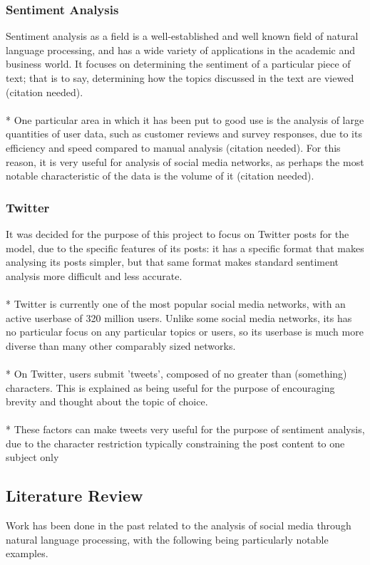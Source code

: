 \documentclass{acm_proc_article-sp}
\begin{document}
		\subsubsection{Sentiment Analysis}
		Sentiment analysis as a field is a well-established and well known field of natural language processing, and has a wide variety of applications in the academic and business world. It focuses on determining the sentiment of a particular piece of text; that is to say, determining how the topics discussed in the text are viewed (citation needed). \\
		\\*
		One particular area in which it has been put to good use is the analysis of large quantities of user data, such as customer reviews and survey responses, due to its efficiency and speed compared to manual analysis (citation needed). For this reason, it is very useful for analysis of social media networks, as perhaps the most notable characteristic of the data is the volume of it (citation needed).
		\subsubsection{Twitter}
		It was decided for the purpose of this project to focus on Twitter posts for the model, due to the specific features of its posts: it has a specific format that makes analysing its posts simpler, but that same format makes standard sentiment analysis more difficult and less accurate.\\
		\\*
		Twitter is currently one of the most popular social media networks, with an active userbase of 320 million users\cite{TwitAbt}. Unlike some social media networks, its has no particular focus on any particular topics or users, so its userbase is much more diverse than many other comparably sized networks.\\
		\\*
		On Twitter, users submit 'tweets', composed of no greater than (something) characters. This is explained as being useful for the purpose of encouraging brevity and thought about the topic of choice.\\
		\\*
		These factors can make tweets very useful for the purpose of sentiment analysis, due to the character restriction typically constraining the post content to one subject only
	\subsection{Literature Review}
	Work has been done in the past related to the analysis of social media through natural language processing, with the following being particularly notable examples. 
\end{document}
